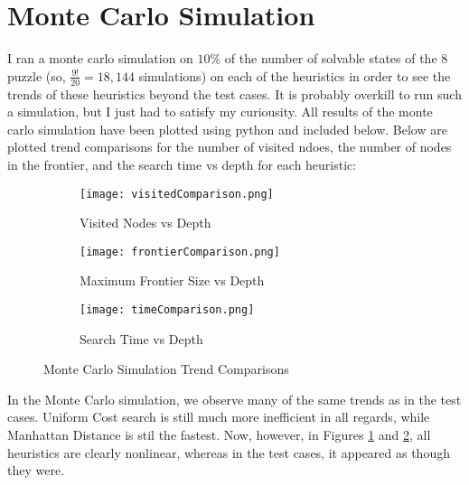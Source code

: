\documentclass{article}
\begin{document}
\section{Monte Carlo Simulation}
I ran a monte carlo simulation on $10\%$ of the number of solvable states of the 8 puzzle (so, $\frac{9!}{20} = 18,144$ simulations) on each of the heuristics in order to see the trends of these heuristics beyond the test cases. It is probably overkill to run such a simulation, but I just had to satisfy my curiousity. All results of the monte carlo simulation have been plotted using python and included below. Below are plotted trend comparisons for the number of visited ndoes, the number of nodes in the frontier, and the search time vs depth for each heuristic:
\begin{figure}[ht]
	\centering
	\begin{subfigure}[b]{0.32\textwidth}
		\centering
		\texttt{[image: visitedComparison.png]}
		\caption{Visited Nodes vs Depth}
		\label{fig:Monte Carlo Visited Nodes Comparison}
	\end{subfigure}
	\hfill
	\begin{subfigure}[b]{0.32\textwidth}
		\centering
		\texttt{[image: frontierComparison.png]}
		\caption{Maximum Frontier Size vs Depth}
		\label{fig:Monte Carlo Maximum Frontier Size Comparison}
	\end{subfigure}
	\hfill
	\begin{subfigure}[b]{0.32\textwidth}
		\centering
		\texttt{[image: timeComparison.png]}
		\caption{Search Time vs Depth}
		\label{fig:Monte Carlo Search Time Comparison}
	\end{subfigure}
	\caption{Monte Carlo Simulation Trend Comparisons}
	\label{fig:Monte Carlo Trend Comparisons}
\end{figure}
\pagebreak
\par In the Monte Carlo simulation, we observe many of the same trends as in the test cases. Uniform Cost search is still much more inefficient in all regards, while Manhattan Distance is stil the fastest. Now, however, in Figures \ref{fig:Monte Carlo Visited Nodes Comparison} and \ref{fig:Monte Carlo Maximum Frontier Size Comparison}, all heuristics are clearly nonlinear, whereas in the test cases, it appeared as though they were.
\end{document}
